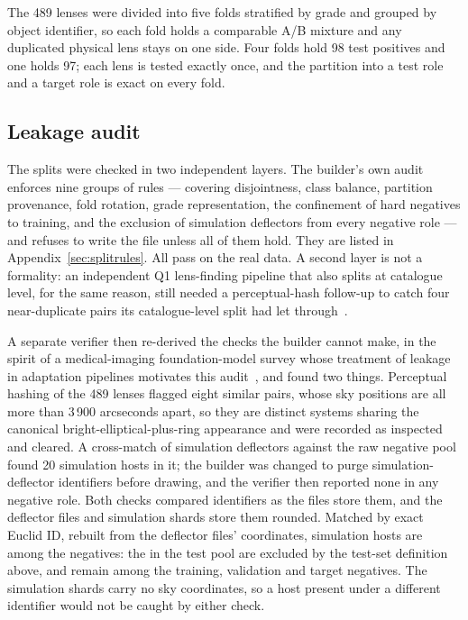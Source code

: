 The 489 lenses were divided into five folds stratified by grade and grouped by object
identifier, so each fold holds a comparable A/B mixture and any duplicated physical lens
stays on one side. Four folds hold 98 test positives and one holds 97; each lens is tested
exactly once, and the partition into a test role and a target role is exact on every fold.

\subsection{Leakage audit}

The splits were checked in two independent layers. The builder's own audit enforces nine
groups of rules --- covering disjointness, class balance, partition provenance, fold
rotation, grade representation, the confinement of hard negatives to training, and the
exclusion of simulation deflectors from every negative role --- and refuses to write the
file unless all of them hold. They are listed in Appendix~\ref{sec:splitrules}. All pass
on the real data. A second layer is not a formality: an independent Q1 lens-finding
pipeline that also splits at catalogue level, for the same reason, still needed a
perceptual-hash follow-up to catch four near-duplicate pairs its catalogue-level split had
let through~\citep{astrovink}.

A separate verifier then re-derived the checks the builder cannot make, in the spirit of a
medical-imaging foundation-model survey whose treatment of leakage in adaptation pipelines
motivates this audit~\citep{domain_leakage}, and found two things. Perceptual
hashing of the 489 lenses flagged eight similar pairs, whose sky positions are all more
than 3\,900 arcseconds apart, so they are distinct systems sharing the canonical
bright-elliptical-plus-ring appearance and were recorded as inspected and cleared. A
cross-match of simulation deflectors against the raw negative pool found 20 simulation
hosts in it; the builder was changed to purge simulation-deflector identifiers before
drawing, and the verifier then reported none in any negative role. Both checks compared
identifiers as the files store them, and the deflector files and simulation shards store
them rounded. Matched by exact Euclid ID, rebuilt from the deflector files' coordinates,
\DeflAllNeg{} simulation hosts are among the negatives: the \DOneDeflNeg{} in the test pool
are excluded by the test-set definition above, and \DeflOtherNeg{} remain among the
training, validation and target negatives. The simulation shards carry no sky coordinates,
so a host present under a different identifier would not be caught by either check.

